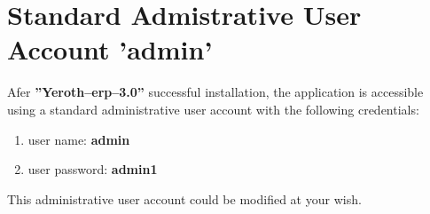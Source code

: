 \documentclass[a4paper, 10pt]{article}
\newcommand{\yerotherptroiszero}{\textbf{''Yeroth--erp--3.0''}\xspace}
\begin{document}
\section{Standard Admistrative User Account 'admin'}


Afer \yerotherptroiszero successful installation,
the application is accessible using a standard
administrative user account with the following
credentials:

\begin{enumerate}[1)]
	\item user name: \textbf{admin}
	\item user password: \textbf{admin1}
\end{enumerate}

This administrative user account could be modified at your wish.
\end{document}
